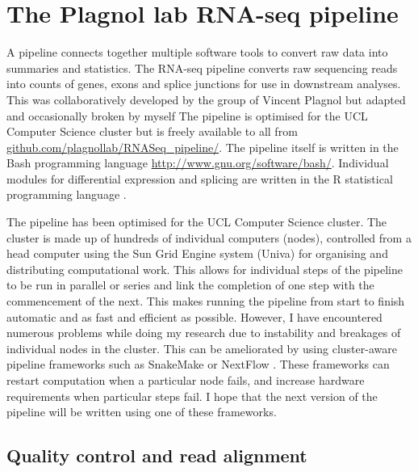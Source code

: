 \section{The Plagnol lab RNA-seq pipeline}

A pipeline connects together multiple software tools to convert raw data into summaries and statistics.
The RNA-seq pipeline converts raw sequencing reads into counts of genes, exons and splice junctions for use in downstream analyses.
This was collaboratively developed by the group of Vincent Plagnol but adapted and occasionally broken by myself
The pipeline is optimised for the UCL Computer Science cluster but is freely available to all from \url{github.com/plagnollab/RNASeq_pipeline/}.
The pipeline itself is written in the Bash programming language \url{http://www.gnu.org/software/bash/}. 
Individual modules for differential expression and splicing are written in the R statistical programming language \citep{Gentleman1996}. 

The pipeline has been optimised for the UCL Computer Science cluster.
The cluster is made up of hundreds of individual computers (nodes), controlled from a head computer using the Sun Grid Engine system (Univa) for organising and distributing computational work.
This allows for individual steps of the pipeline to be run in parallel or series and link the completion of one step with the commencement of the next.
This makes running the pipeline from start to finish automatic and as fast and efficient as possible.
However, I have encountered numerous problems while doing my research due to instability and breakages of individual nodes in the cluster.
This can be ameliorated by using cluster-aware pipeline frameworks such as SnakeMake or NextFlow \citep{Koster2012,DiTommaso2017}. 
These frameworks can restart computation when a particular node fails, and increase hardware requirements when particular steps fail.
I hope that the next version of the pipeline will be written using one of these frameworks.


\subsection{Quality control and read alignment}


